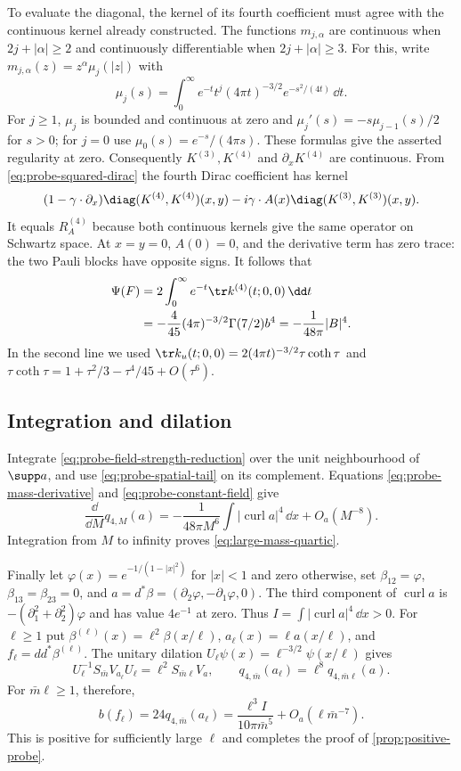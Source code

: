 \documentclass[11pt,letterpaper,reqno]{amsart}
\begin{document}
To evaluate the diagonal, the kernel of its fourth coefficient must
agree with the continuous kernel already constructed. The functions
$m_{j,\alpha}$ are continuous when $2j+|\alpha|\ge2$ and continuously
differentiable when $2j+|\alpha|\ge3$. For this, write
$m_{j,\alpha}(z)=z^\alpha\mu_j(|z|)$ with
\[
 \mu_j(s)=\int_0^\infty e^{-t}t^j(4\pi t)^{-3/2}e^{-s^2/(4t)}\,\dd t.
\]
For $j\ge1$, $\mu_j$ is bounded and continuous at zero and
$\mu_j'(s)=-s\mu_{j-1}(s)/2$ for $s>0$; for $j=0$ use
$\mu_0(s)=e^{-s}/(4\pi s)$. These formulas give the asserted
regularity at zero. Consequently $K^{(3)},K^{(4)}$ and
$\partial_xK^{(4)}$ are continuous. From
\eqref{eq:probe-squared-dirac} the fourth Dirac coefficient has kernel
\[
 (1-\gamma\cdot\partial_x)\diag(K^{(4)},K^{(4)})(x,y)
       -i\gamma\cdot A(x)\diag(K^{(3)},K^{(3)})(x,y).
\]
It equals $R_A^{(4)}$ because both continuous kernels give the same
operator on Schwartz space. At $x=y=0$, $A(0)=0$, and the derivative
term has zero trace: the two Pauli blocks have opposite signs.
It follows that
\begin{align}
 \Psi(F)&=2\int_0^\infty e^{-t}\tr k^{(4)}(t;0,0)\,\dd t\\
 &=-\frac4{45}(4\pi)^{-3/2}\Gamma(7/2)b^4
   =-\frac1{48\pi}|B|^4.\label{eq:probe-constant-field}
\end{align}
In the second line we used
$\tr k_u(t;0,0)=2(4\pi t)^{-3/2}\tau\coth\tau$ and
$\tau\coth\tau=1+\tau^2/3-\tau^4/45+O(\tau^6)$.

\subsection{Integration and dilation}

Integrate \eqref{eq:probe-field-strength-reduction} over the unit
neighbourhood of $\supp a$, and use \eqref{eq:probe-spatial-tail}
on its complement. Equations \eqref{eq:probe-mass-derivative} and
\eqref{eq:probe-constant-field} give
\[
 \frac{\dd}{\dd M}q_{4,M}(a)
 =-\frac1{48\pi M^6}\int|\operatorname{curl}a|^4\,\dd x
                                    +O_a(M^{-8}).
\]
Integration from $M$ to infinity proves
\eqref{eq:large-mass-quartic}.

Finally let $\varphi(x)=e^{-1/(1-|x|^2)}$ for $|x|<1$ and zero
otherwise, set $\beta_{12}=\varphi$, $\beta_{13}=\beta_{23}=0$, and
$a=d^*\beta=(\partial_2\varphi,-\partial_1\varphi,0)$.
The third component of $\operatorname{curl}a$ is
$-(\partial_1^2+\partial_2^2)\varphi$ and has value $4e^{-1}$ at zero.
Thus $I=\int|\operatorname{curl}a|^4\,\dd x>0$.
For $\ell\ge1$ put
$\beta^{(\ell)}(x)=\ell^2\beta(x/\ell)$,
$a_\ell(x)=\ell a(x/\ell)$, and $f_\ell=dd^*\beta^{(\ell)}$.
The unitary dilation $U_\ell\psi(x)=\ell^{-3/2}\psi(x/\ell)$ gives
\[
 U_\ell^{-1}S_{\bar m}V_{a_\ell}U_\ell
       =\ell^2S_{\bar m\ell}V_a,
 \qquad q_{4,\bar m}(a_\ell)=\ell^8q_{4,\bar m\ell}(a).
\]
For $\bar m\ell\ge1$, therefore,
\begin{equation}\label{eq:probe-positive-dilation}
 b(f_\ell)=24q_{4,\bar m}(a_\ell)
   =\frac{\ell^3I}{10\pi\bar m^5}
                      +O_a(\ell\bar m^{-7}).
\end{equation}
This is positive for sufficiently large $\ell$ and completes the proof
of \cref{prop:positive-probe}.
\end{document}
